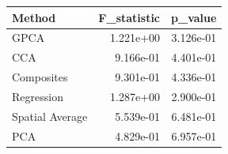 \begin{tabular}{lrr}
\toprule
Method & F_statistic & p_value \\
\midrule
GPCA & 1.221e+00 & 3.126e-01 \\
CCA & 9.166e-01 & 4.401e-01 \\
Composites & 9.301e-01 & 4.336e-01 \\
Regression & 1.287e+00 & 2.900e-01 \\
Spatial Average & 5.539e-01 & 6.481e-01 \\
PCA & 4.829e-01 & 6.957e-01 \\
\bottomrule
\end{tabular}
